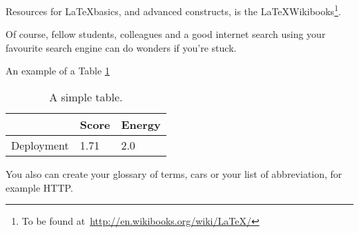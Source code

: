 Resources for \LaTeX basics, and advanced constructs, is the \LaTeX Wikibooks\footnote{To be found at~\url{http://en.wikibooks.org/wiki/LaTeX/}}.

Of course, fellow students, colleagues and a good internet search using your favourite search engine can do wonders if you're stuck.

An example of a Table \ref{tab:yourtable}

\begin{table}[h]
  \centering
  \caption{A simple table.}
  \label{tab:yourtable}
  \begin{tabular}{l|l|l} 
  \hline
   & Score & Energy  \\
  \hline
  Deployment & 1.71  & 2.0 \\
  \hline
  \end{tabular}
  \newline
\end{table}

You also can create your glossary of terms, \glspl{car} or your list of abbreviation, for example \acs{HTTP}\label{acro:HTTP}.
